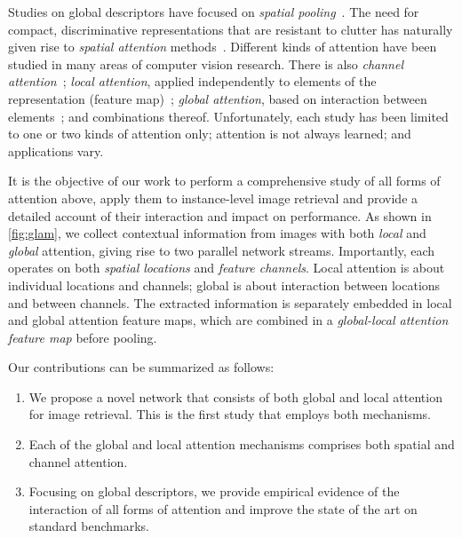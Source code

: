 Studies on global descriptors have focused on \emph{spatial pooling}~\cite{Babenko03,Radenovic01}. The need for compact, discriminative representations that are resistant to clutter has naturally given rise to \emph{spatial attention} methods~\cite{Kalantidis01,Ng01}. Different kinds of attention have been studied in many areas of computer vision research. There is also \emph{channel attention}~\cite{Hu01,ChenKLYF18}; \emph{local attention}, applied independently to elements of the representation (feature map)~\cite{woo01,Kim01}; \emph{global attention}, based on interaction between elements~\cite{Wang02,ChenKLYF18}; and combinations thereof. Unfortunately, each study has been limited to one or two kinds of attention only; attention is not always learned; and applications vary.

It is the objective of our work to perform a comprehensive study of all forms of attention above, apply them to instance-level image retrieval and provide a detailed account of their interaction and impact on performance. As shown in \autoref{fig:glam}, we collect contextual information from images with both \emph{local} and \emph{global} attention, giving rise to two parallel network streams. Importantly, each operates on both \emph{spatial locations} and \emph{feature channels}. Local attention is about individual locations and channels; global is about interaction between locations and between channels. The extracted information is separately embedded in local and global attention feature maps, which are combined in a \emph{global-local attention feature map} before pooling.

Our contributions can be summarized as follows:
\begin{enumerate}[itemsep=2pt, parsep=0pt, topsep=0pt]
	 \item We propose a novel network that consists of both global and local attention for image retrieval. This is the first study that employs both mechanisms.
	 \item Each of the global and local attention mechanisms comprises both spatial and channel attention.
	 \item Focusing on global descriptors, we provide empirical evidence of the interaction of all forms of attention and improve the state of the art on standard benchmarks.
\end{enumerate}
